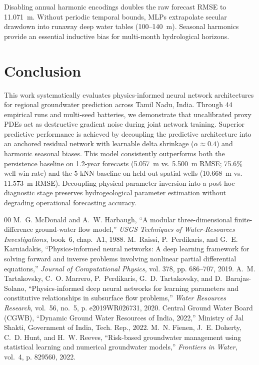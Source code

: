\documentclass[10pt,conference,letterpaper]{IEEEtran}
\begin{document}
Disabling annual harmonic encodings doubles the raw forecast RMSE to 11.071~m. Without periodic temporal bounds, MLPs extrapolate secular drawdown into runaway deep water tables (100--140~m). Seasonal harmonics provide an essential inductive bias for multi-month hydrological horizons.

\section{Conclusion}
This work systematically evaluates physics-informed neural network architectures for regional groundwater prediction across Tamil Nadu, India. Through 44 empirical runs and multi-seed batteries, we demonstrate that uncalibrated proxy PDEs act as destructive gradient noise during joint network training. Superior predictive performance is achieved by decoupling the predictive architecture into an anchored residual network with learnable delta shrinkage ($\alpha \approx 0.4$) and harmonic seasonal biases. This model consistently outperforms both the persistence baseline on 1.2-year forecasts (5.057~m vs. 5.500~m RMSE; 75.6\% well win rate) and the 5-kNN baseline on held-out spatial wells (10.668~m vs. 11.573~m RMSE). Decoupling physical parameter inversion into a post-hoc diagnostic stage preserves hydrogeological parameter estimation without degrading operational forecasting accuracy.


\begin{thebibliography}{00}
 M.~G. McDonald and A.~W. Harbaugh, ``A modular three-dimensional finite-difference ground-water flow model,'' \emph{USGS Techniques of Water-Resources Investigations}, book~6, chap.~A1, 1988.
 M.~Raissi, P.~Perdikaris, and G.~E. Karniadakis, ``Physics-informed neural networks: A deep learning framework for solving forward and inverse problems involving nonlinear partial differential equations,'' \emph{Journal of Computational Physics}, vol. 378, pp. 686--707, 2019.
 A.~M. Tartakovsky, C.~O. Marrero, P.~Perdikaris, G.~D. Tartakovsky, and D.~Barajas-Solano, ``Physics-informed deep neural networks for learning parameters and constitutive relationships in subsurface flow problems,'' \emph{Water Resources Research}, vol.~56, no.~5, p. e2019WR026731, 2020.
 Central Ground Water Board (CGWB), ``Dynamic Ground Water Resources of India, 2022,'' Ministry of Jal Shakti, Government of India, Tech. Rep., 2022.
 M.~N. Fienen, J.~E. Doherty, C.~D. Hunt, and H.~W. Reeves, ``Risk-based groundwater management using statistical learning and numerical groundwater models,'' \emph{Frontiers in Water}, vol.~4, p. 829560, 2022.
\end{thebibliography}
\end{document}
